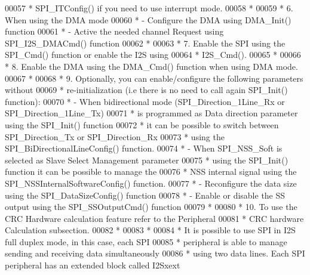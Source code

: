 \begin{DoxyCode}
00057 \textcolor{comment}{  *             SPI\_ITConfig() if you need to use interrupt mode. }
00058 \textcolor{comment}{  *}
00059 \textcolor{comment}{  *          6. When using the DMA mode }
00060 \textcolor{comment}{  *                   - Configure the DMA using DMA\_Init() function}
00061 \textcolor{comment}{  *                   - Active the needed channel Request using SPI\_I2S\_DMACmd() function}
00062 \textcolor{comment}{  * }
00063 \textcolor{comment}{  *          7. Enable the SPI using the SPI\_Cmd() function or enable the I2S using}
00064 \textcolor{comment}{  *             I2S\_Cmd().}
00065 \textcolor{comment}{  * }
00066 \textcolor{comment}{  *          8. Enable the DMA using the DMA\_Cmd() function when using DMA mode. }
00067 \textcolor{comment}{  *}
00068 \textcolor{comment}{  *          9. Optionally, you can enable/configure the following parameters without}
00069 \textcolor{comment}{  *             re-initialization (i.e there is no need to call again SPI\_Init() function):}
00070 \textcolor{comment}{  *              - When bidirectional mode (SPI\_Direction\_1Line\_Rx or SPI\_Direction\_1Line\_Tx)}
00071 \textcolor{comment}{  *                is programmed as Data direction parameter using the SPI\_Init() function}
00072 \textcolor{comment}{  *                it can be possible to switch between SPI\_Direction\_Tx or SPI\_Direction\_Rx}
00073 \textcolor{comment}{  *                using the SPI\_BiDirectionalLineConfig() function.}
00074 \textcolor{comment}{  *              - When SPI\_NSS\_Soft is selected as Slave Select Management parameter }
00075 \textcolor{comment}{  *                using the SPI\_Init() function it can be possible to manage the }
00076 \textcolor{comment}{  *                NSS internal signal using the SPI\_NSSInternalSoftwareConfig() function.}
00077 \textcolor{comment}{  *              - Reconfigure the data size using the SPI\_DataSizeConfig() function  }
00078 \textcolor{comment}{  *              - Enable or disable the SS output using the SPI\_SSOutputCmd() function  }
00079 \textcolor{comment}{  *          }
00080 \textcolor{comment}{  *          10. To use the CRC Hardware calculation feature refer to the Peripheral }
00081 \textcolor{comment}{  *              CRC hardware Calculation subsection.}
00082 \textcolor{comment}{  *   }
00083 \textcolor{comment}{  *}
00084 \textcolor{comment}{  *          It is possible to use SPI in I2S full duplex mode, in this case, each SPI }
00085 \textcolor{comment}{  *          peripheral is able to manage sending and receiving data simultaneously}
00086 \textcolor{comment}{  *          using two data lines. Each SPI peripheral has an extended block called I2Sxext}

\end{DoxyCode}

